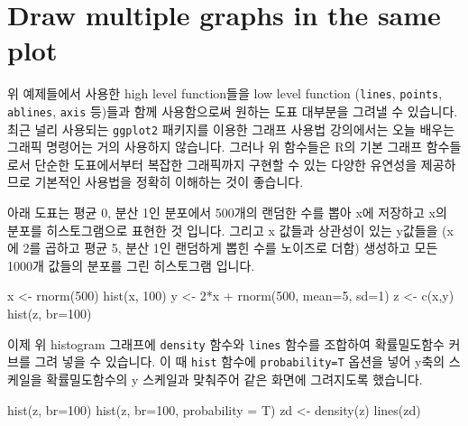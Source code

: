 \documentclass[
]{book}
\newenvironment{Shaded}{\begin{snugshade}}{\end{snugshade}}
\newcommand{\AttributeTok}[1]{\textcolor[rgb]{0.77,0.63,0.00}{#1}}
\newcommand{\DecValTok}[1]{\textcolor[rgb]{0.00,0.00,0.81}{#1}}
\newcommand{\FunctionTok}[1]{\textcolor[rgb]{0.00,0.00,0.00}{#1}}
\newcommand{\NormalTok}[1]{#1}
\newcommand{\OtherTok}[1]{\textcolor[rgb]{0.56,0.35,0.01}{#1}}
\newcommand{\SpecialCharTok}[1]{\textcolor[rgb]{0.00,0.00,0.00}{#1}}
\begin{document}
\hypertarget{draw-multiple-graphs-in-the-same-plot}{%
\section{Draw multiple graphs in the same plot}\label{draw-multiple-graphs-in-the-same-plot}}

위 예제들에서 사용한 high level function들을 low level function (\texttt{lines}, \texttt{points}, \texttt{ablines}, \texttt{axis} 등)들과 함께 사용함으로써 원하는 도표 대부분을 그려낼 수 있습니다. 최근 널리 사용되는 \texttt{ggplot2} 패키지를 이용한 그래프 사용법 강의에서는 오늘 배우는 그래픽 명령어는 거의 사용하지 않습니다. 그러나 위 함수들은 R의 기본 그래프 함수들로서 단순한 도표에서부터 복잡한 그래픽까지 구현할 수 있는 다양한 유연성을 제공하므로 기본적인 사용법을 정확히 이해하는 것이 좋습니다.

아래 도표는 평균 0, 분산 1인 분포에서 500개의 랜덤한 수를 뽑아 x에 저장하고 x의 분포를 히스토그램으로 표현한 것 입니다. 그리고 x 값들과 상관성이 있는 y값들을 (x에 2를 곱하고 평균 5, 분산 1인 랜덤하게 뽑힌 수를 노이즈로 더함) 생성하고 모든 1000개 값들의 분포를 그린 히스토그램 입니다.

\begin{Shaded}
\begin{Highlighting}[]
\NormalTok{x }\OtherTok{\textless{}{-}} \FunctionTok{rnorm}\NormalTok{(}\DecValTok{500}\NormalTok{)}
\FunctionTok{hist}\NormalTok{(x, }\DecValTok{100}\NormalTok{)}
\NormalTok{y }\OtherTok{\textless{}{-}} \DecValTok{2}\SpecialCharTok{*}\NormalTok{x }\SpecialCharTok{+} \FunctionTok{rnorm}\NormalTok{(}\DecValTok{500}\NormalTok{, }\AttributeTok{mean=}\DecValTok{5}\NormalTok{, }\AttributeTok{sd=}\DecValTok{1}\NormalTok{)}
\NormalTok{z }\OtherTok{\textless{}{-}} \FunctionTok{c}\NormalTok{(x,y)}
\FunctionTok{hist}\NormalTok{(z, }\AttributeTok{br=}\DecValTok{100}\NormalTok{)}
\end{Highlighting}
\end{Shaded}

이제 위 histogram 그래프에 \texttt{density} 함수와 \texttt{lines} 함수를 조합하여 확률밀도함수 커브를 그려 넣을 수 있습니다. 이 때 \texttt{hist} 함수에 \texttt{probability=T} 옵션을 넣어 y축의 스케일을 확률밀도함수의 y 스케일과 맞춰주어 같은 화면에 그려지도록 했습니다.

\begin{Shaded}
\begin{Highlighting}[]
\FunctionTok{hist}\NormalTok{(z, }\AttributeTok{br=}\DecValTok{100}\NormalTok{)}
\FunctionTok{hist}\NormalTok{(z, }\AttributeTok{br=}\DecValTok{100}\NormalTok{, }\AttributeTok{probability =}\NormalTok{ T)}
\NormalTok{zd }\OtherTok{\textless{}{-}} \FunctionTok{density}\NormalTok{(z)}
\FunctionTok{lines}\NormalTok{(zd)}
\end{Highlighting}
\end{Shaded}
\end{document}
